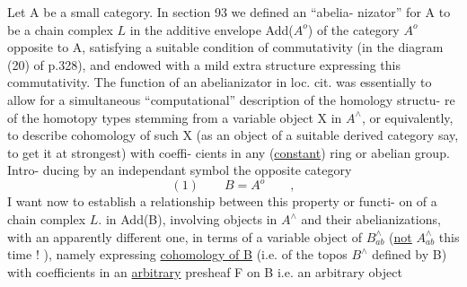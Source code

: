 Let A be a small category.  In section 93 we defined an ``abelia-%
nizator'' for A  to be a chain complex  $L$\over{,}{$_\bullet$}  in the additive envelope
Add($A^{o}$)  of the category $A^{o}$ opposite to A,   satisfying a
suitable condition of commutativity (in the diagram (20) of p.328),
and endowed with a mild extra structure\inserted{$\lambda$,} expressing this commutativity.
The function of an abelianizator in loc. cit.  was essentially to allow
for a simultaneous ``computational'' description of the homology structu-%
re of the homotopy types stemming from a variable object X in $A^{\wedge}$,  or
equivalently,  to describe cohomology of such X (as an object of
a suitable derived category say, to get it at strongest) with coeffi-%
cients in any (\uline{constant})  ring or abelian group.  Intro-%
ducing by an independant symbol the opposite category
\[ (1) \qquad B = A^{o} \qquad , \]
I want now to establish a relationship between this property or functi-%
on of a chain complex  $L.$\hand{\unsure{$_\bullet$}}  in Add(B),   involving objects in $A^{\wedge}$
and their abelianizations, with an apparently different one,  in
terms of a variable object of $B^{\wedge}_{ab}$  (\uline{not}  $A^{\wedge}_{ab}$  this time ! ),  namely
expressing \uline{cohomology of B} (i.e. of the topos $B^{\wedge}$ defined by B) with
coefficients in an \uline{arbitrary} presheaf  F on B  i.e. an arbitrary object
